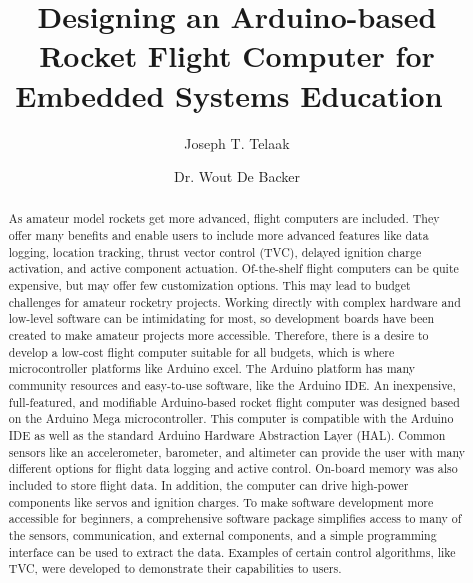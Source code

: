 \documentclass[conf]{new-aiaa}
\title{Designing an Arduino-based Rocket Flight Computer for Embedded Systems Education\ }
\author{Joseph T. Telaak}
\affil{University of South Carolina, Columbia, SC, 29201, US}
\author{Dr. Wout De Backer}
\affil{Associate Professor, Ronald E. McNAIR Center for Aerospace Innovation and Research, University of South Carolina, Columbia, SC, 29201, US}
\begin{document}
\maketitle

\begin{abstract}
As amateur model rockets get more advanced, flight computers are included. They offer many benefits and enable users to include more advanced features like data logging, location tracking, thrust vector control (TVC), delayed ignition charge activation, and active component actuation. Of-the-shelf flight computers can be quite expensive, but may offer few customization options. This may lead to budget challenges for amateur rocketry projects. Working directly with complex hardware and low-level software can be intimidating for most, so development boards have been created to make amateur projects more accessible. Therefore, there is a desire to develop a low-cost flight computer suitable for all budgets, which is where microcontroller platforms like Arduino excel. The Arduino platform has many community resources and easy-to-use software, like the Arduino IDE. An inexpensive, full-featured, and modifiable Arduino-based rocket flight computer was designed based on the Arduino Mega microcontroller. This computer is compatible with the Arduino IDE as well as the standard Arduino Hardware Abstraction Layer (HAL). Common sensors like an accelerometer, barometer, and altimeter can provide the user with many different options for flight data logging and active control. On-board memory was also included to store flight data. In addition, the computer can drive high-power components like servos and ignition charges. To make software development more accessible for beginners, a comprehensive software package simplifies access to many of the sensors, communication, and external components, and a simple programming interface can be used to extract the data. Examples of certain control algorithms, like TVC, were developed to demonstrate their capabilities to users. 
\end{abstract}
\end{document}
